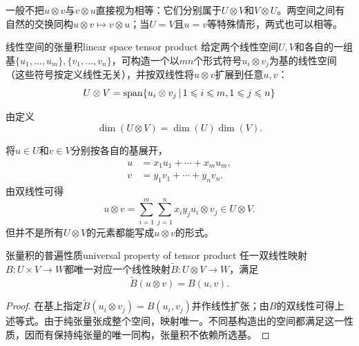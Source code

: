 \begin{remark}
	一般不把$u \otimes v$与$v \otimes u$直接视为相等：它们分别属于$U \otimes V$和$V \otimes U$。两空间之间有自然的交换同构$u \otimes v \mapsto v \otimes u$；当$U = V$且$u = v$等特殊情形，两式也可以相等。
\end{remark}
\begin{definition}{线性空间的张量积}{linear space tensor product}
	给定两个线性空间$U,V$和各自的一组基$\{u_1,\ldots,u_m\},\{v_1,\ldots,v_n\}$，可构造一个以$mn$个形式符号$u_i \otimes v_j$为基的线性空间（这些符号按定义线性无关），并按双线性将$u \otimes v$扩展到任意$u,v$：
	\begin{equation}
		U \otimes V = \operatorname{span}\{u_i \otimes v_j\,\vert\,1 \leqslant i \leqslant m,1 \leqslant j \leqslant n\}
	\end{equation}
\end{definition}
\begin{corollary}
	由定义 
	\begin{equation}\label{eq:la-tensor-product-dimension}
		\dim(U \otimes V) = \dim(U)\dim(V).
	\end{equation}
\end{corollary}
\begin{example}{}{}
	将$u \in U$和$v \in V$分别按各自的基展开，
	\begin{align*}
		u &= x_1u_1 + \cdots + x_mu_m,\\
		v &= y_1v_1 + \cdots + y_nv_n.
	\end{align*}
	由双线性可得
	\[
		u \otimes v = \sum_{i=1}^m\sum_{j=1}^nx_iy_ju_i \otimes v_j \in U \otimes V.
	\]
	但并不是所有$U \otimes V$的元素都能写成$u \otimes v$的形式。
\end{example}
\begin{theorem}{张量积的普遍性质}{universal property of tensor product}
    任一双线性映射$B:U \times V \to W$都唯一对应一个线性映射$\widetilde B:U \otimes V \to W$，满足
    \begin{equation}\label{eq:la-tensor-universal-property}
        \widetilde B(u \otimes v) = B(u,v).
    \end{equation}
\end{theorem}
\begin{proof}
    在基上指定$\widetilde B(u_i \otimes v_j) = B(u_i,v_j)$并作线性扩张；由$B$的双线性可得上述等式。由于纯张量张成整个空间，映射唯一。不同基构造出的空间都满足这一性质，因而有保持纯张量的唯一同构，张量积不依赖所选基。
\end{proof}


